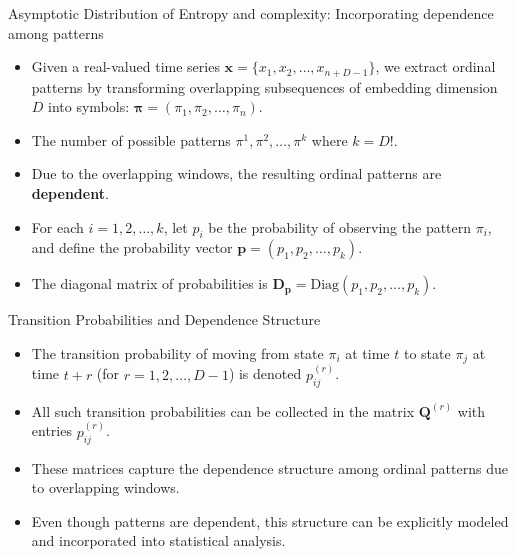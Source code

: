 \documentclass{beamer}
\begin{document}
	

\begin{frame}{Asymptotic Distribution of Entropy and complexity: Incorporating dependence among patterns}
	\begin{itemize}
		\item Given a real-valued time series $\mathbf{x} = \{x_1, x_2, \ldots, x_{n+D-1}\}$, we extract ordinal patterns by transforming overlapping subsequences of embedding dimension $D$ into symbols: $\mathbf{\pi} = (\pi_1, \pi_2, \ldots, \pi_n)$.
		\item The number of possible patterns $\pi^1, \pi^2, \ldots, \pi^k$ where $k = D!$.
		\item Due to the overlapping windows, the resulting ordinal patterns are \textbf{dependent}.
		\item For each $i = 1, 2, \ldots, k$, let $p_i$ be the probability of observing the pattern $\pi_i$, and define the probability vector $\mathbf{p} = (p_1, p_2, \ldots, p_k)$.
		\item The diagonal matrix of probabilities is $\mathbf{D_p} = \text{Diag}(p_1, p_2, \ldots, p_k)$.
	\end{itemize}
\end{frame}

\begin{frame}{Transition Probabilities and Dependence Structure}
	\begin{itemize}
		\item The transition probability of moving from state $\pi_i$ at time $t$ to state $\pi_j$ at time $t+r$ (for $r = 1, 2, \ldots, D-1$) is denoted $p^{(r)}_{ij}$.
		\item All such transition probabilities can be collected in the matrix $\mathbf{Q}^{(r)}$ with entries $p^{(r)}_{ij}$.
		\item These matrices capture the dependence structure among ordinal patterns due to overlapping windows.
		\item Even though patterns are dependent, this structure can be explicitly modeled and incorporated into statistical analysis.
	\end{itemize}
\end{frame}
\end{document}

